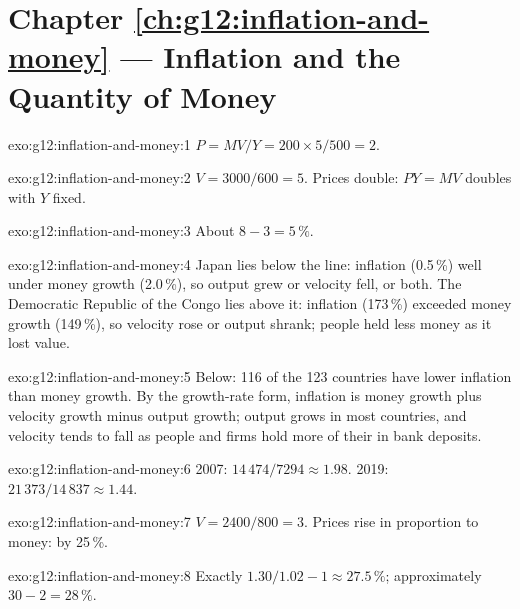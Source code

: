 \section*{Chapter \ref{ch:g12:inflation-and-money} --- Inflation and the Quantity of Money}

\begin{solution}{exo:g12:inflation-and-money:1}
$P = MV/Y = 200 \times 5/500 = 2$.
\end{solution}

\begin{solution}{exo:g12:inflation-and-money:2}
$V = 3000/600 = 5$. Prices double: $PY = MV$ doubles with $Y$ fixed.
\end{solution}

\begin{solution}{exo:g12:inflation-and-money:3}
About $8 - 3 = 5\,\%$.
\end{solution}

\begin{solution}{exo:g12:inflation-and-money:4}
Japan lies below the line: inflation (0.5\,\%) well under money growth (2.0\,\%), so output grew or velocity fell, or both. The Democratic Republic of the Congo lies above
it: inflation (173\,\%) exceeded money growth (149\,\%), so velocity rose or output shrank; people held less money as it lost value.
\end{solution}

\begin{solution}{exo:g12:inflation-and-money:5}
Below: 116 of the 123 countries have lower inflation than money growth. By the growth-rate form, inflation is money growth plus velocity growth minus output growth; output
grows in most countries, and velocity tends to fall as people and firms hold more of their  in bank deposits.
\end{solution}

\begin{solution}{exo:g12:inflation-and-money:6}
2007: $14\,474/7294 \approx 1.98$. 2019: $21\,373/14\,837 \approx 1.44$.
\end{solution}

\begin{solution}{exo:g12:inflation-and-money:7}
$V = 2400/800 = 3$. Prices rise in proportion to money: by 25\,\%.
\end{solution}

\begin{solution}{exo:g12:inflation-and-money:8}
Exactly $1.30/1.02 - 1 \approx 27.5\,\%$; approximately $30 - 2 = 28\,\%$.
\end{solution}

